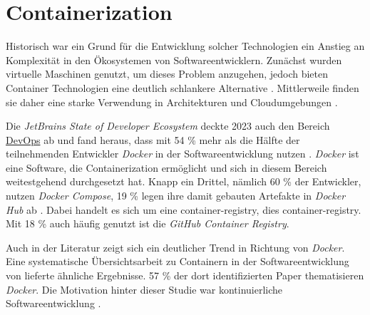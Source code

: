 \section{Containerization}
\label{sec:02-03_containerization}

 \cite{023:Setting-up-CI-CD-Pipeline-in-the-Cloud-for-Web-Application}

Historisch war ein Grund für die Entwicklung solcher Technologien ein Anstieg an Komplexität in den Ökosystemen von Softwareentwicklern. Zunächst wurden virtuelle Maschinen genutzt, um dieses Problem anzugehen, jedoch bieten Container Technologien eine deutlich schlankere Alternative \cite{014:Managing-Container-based-Software-Development-Environments}. Mittlerweile finden sie daher eine starke Verwendung in  Architekturen \cite{014:Managing-Container-based-Software-Development-Environments} und Cloudumgebungen \cite{025:Exploring-Solutions-for-Container-Image-Security}.

Die \textit{JetBrains State of Developer Ecosystem} deckte 2023 auch den Bereich \hyperref[sec:03-01_devops]{DevOps} ab und fand heraus, dass mit 54 \% mehr als die Hälfte der teilnehmenden Entwickler \textit{Docker} in der Softwareentwicklung nutzen \cite{207:Developer-Ecosystem}. \textit{Docker} ist eine Software, die Containerization ermöglicht und sich in diesem Bereich weitestgehend durchgesetzt hat. Knapp ein Drittel, nämlich 60 \% der Entwickler, nutzen \textit{Docker Compose}, 19 \% legen ihre damit gebauten Artefakte in \textit{Docker Hub} ab \cite{207:Developer-Ecosystem}. Dabei handelt es sich um eine \Gls{container-registry}, dies \glsdesc{container-registry}. Mit 18 \% auch häufig genutzt ist die \textit{GitHub Container Registry}.

Auch in der Literatur zeigt sich ein deutlicher Trend in Richtung von \textit{Docker}. Eine systematische Übersichtsarbeit zu Containern in der Softwareentwicklung von \citeauthor{015:Containers-in-Software-Development} lieferte ähnliche Ergebnisse. 57 \% der dort identifizierten Paper thematisieren \textit{Docker}. Die Motivation hinter dieser Studie war kontinuierliche Softwareentwicklung \cite{015:Containers-in-Software-Development}.

